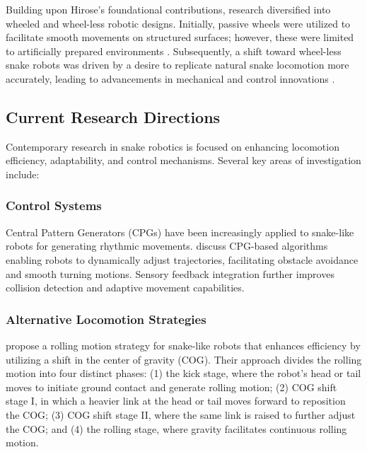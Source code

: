 \documentclass[12pt,a4paper]{report}
\begin{document}
Building upon Hirose's foundational contributions, research diversified into wheeled and wheel-less robotic designs. Initially, passive wheels were utilized to facilitate smooth movements on structured surfaces; however, these were limited to artificially prepared environments \cite{Bayraktaroglu2006}. Subsequently, a shift toward wheel-less snake robots was driven by a desire to replicate natural snake locomotion more accurately, leading to advancements in mechanical and control innovations \cite{transeth-2009}.

\subsection{Current Research Directions}
Contemporary research in snake robotics is focused on enhancing locomotion efficiency, adaptability, and control mechanisms. Several key areas of investigation include:

\subsubsection{Control Systems}

Central Pattern Generators (CPGs) have been increasingly applied to snake-like robots for generating rhythmic movements. \textcite{Seeja2022} discuss CPG-based algorithms enabling robots to dynamically adjust trajectories, facilitating obstacle avoidance and smooth turning motions. Sensory feedback integration further improves collision detection and adaptive movement capabilities.

\subsubsection{Alternative Locomotion Strategies}
\textcite{yamano-2023} propose a rolling motion strategy for snake-like robots that enhances efficiency by utilizing a shift in the center of gravity (COG). Their approach divides the rolling motion into four distinct phases: (1) the kick stage, where the robot’s head or tail moves to initiate ground contact and generate rolling motion; (2) COG shift stage I, in which a heavier link at the head or tail moves forward to reposition the COG; (3) COG shift stage II, where the same link is raised to further adjust the COG; and (4) the rolling stage, where gravity facilitates continuous rolling motion.
\end{document}
